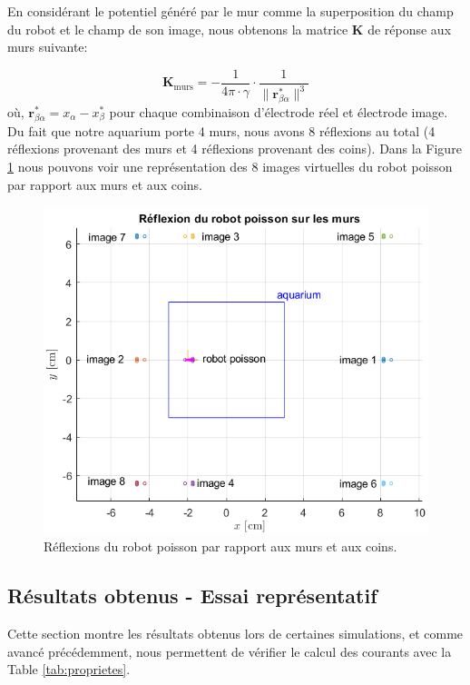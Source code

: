 En considérant le potentiel généré par le mur comme la superposition du champ du robot et le champ de son image, nous obtenons la matrice $\mathbf{K}$ de réponse aux murs suivante: 

\begin{equation}
    \mathbf{K}_{\text{murs}} = - \frac{1}{4\pi \cdot \gamma} \cdot \frac{1}{\lVert \mathbf{r}_{\beta\alpha}^* \rVert^3}
\end{equation}
où, $\mathbf{r}_{\beta\alpha}^* = x_\alpha - x_\beta^*$ pour chaque combinaison d'électrode réel et électrode image. Du fait que notre aquarium porte 4 murs, nous avons 8 réflexions au total (4 réflexions provenant des murs et 4 réflexions provenant des coins). Dans la Figure \ref{fig:wall_reflexion} nous pouvons voir une représentation des 8 images virtuelles du robot poisson par rapport aux murs et aux coins. 

\begin{figure}
    \centering
    \includegraphics[scale=0.8]{assets/wall_reflexions/wall_reflexion.png}
    \caption{\centering Réflexions du robot poisson par rapport aux murs et aux coins.}
    \label{fig:wall_reflexion}
\end{figure}
\clearpage

\subsection{Résultats obtenus - Essai représentatif} \label{sec:resultats}
Cette section montre les résultats obtenus lors de certaines simulations, et comme avancé précédemment, nous permettent de vérifier le calcul des courants avec la Table \ref{tab:proprietes}. 

